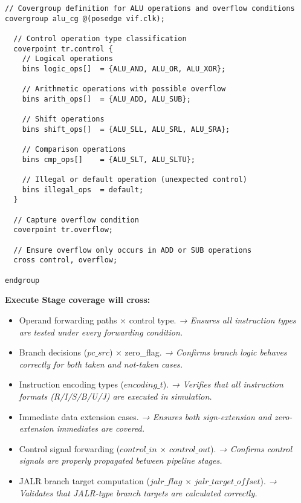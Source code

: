 \documentclass[a4paper,12pt]{article}
\begin{document}
\begin{verbatim}
// Covergroup definition for ALU operations and overflow conditions
covergroup alu_cg @(posedge vif.clk);

  // Control operation type classification
  coverpoint tr.control {
    // Logical operations
    bins logic_ops[]  = {ALU_AND, ALU_OR, ALU_XOR};

    // Arithmetic operations with possible overflow
    bins arith_ops[]  = {ALU_ADD, ALU_SUB};

    // Shift operations
    bins shift_ops[]  = {ALU_SLL, ALU_SRL, ALU_SRA};

    // Comparison operations
    bins cmp_ops[]    = {ALU_SLT, ALU_SLTU};

    // Illegal or default operation (unexpected control)
    bins illegal_ops  = default;
  }

  // Capture overflow condition
  coverpoint tr.overflow;

  // Ensure overflow only occurs in ADD or SUB operations
  cross control, overflow;

endgroup
\end{verbatim}
\textbf{Execute Stage coverage will cross:}
\begin{itemize}
    \item Operand forwarding paths $\times$ control type.  
    \textit{→ Ensures all instruction types are tested under every forwarding condition.}

    \item Branch decisions ($pc\_src$) $\times$ zero\_flag.  
    \textit{→ Confirms branch logic behaves correctly for both taken and not-taken cases.}

    \item Instruction encoding types ($encoding\_t$).  
    \textit{→ Verifies that all instruction formats (R/I/S/B/U/J) are executed in simulation.}

    \item Immediate data extension cases.  
    \textit{→ Ensures both sign-extension and zero-extension immediates are covered.}

    \item Control signal forwarding ($control\_in$ $\times$ $control\_out$).  
    \textit{→ Confirms control signals are properly propagated between pipeline stages.}

    \item JALR branch target computation ($jalr\_flag$ $\times$ $jalr\_target\_offset$).  
    \textit{→ Validates that JALR-type branch targets are calculated correctly.}
\end{itemize}
\end{document}
